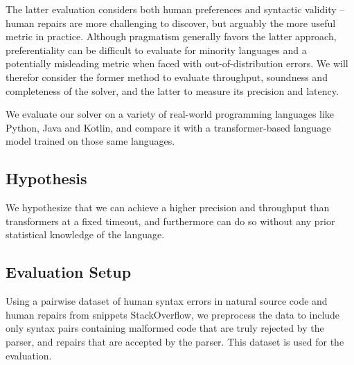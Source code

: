\documentclass[sigplan,screen]{acmart}
\begin{document}
The latter evaluation considers both human preferences and syntactic validity -- human repairs are more challenging to discover, but arguably the more useful metric in practice. Although pragmatism generally favors the latter approach, preferentiality can be difficult to evaluate for minority languages and a potentially misleading metric when faced with out-of-distribution errors. We will therefor consider the former method to evaluate throughput, soundness and completeness of the solver, and the latter to measure its precision and latency.

We evaluate our solver on a variety of real-world programming languages like Python, Java and Kotlin, and compare it with a transformer-based language model trained on those same languages.

\subsection{Hypothesis}


We hypothesize that we can achieve a higher precision and throughput than transformers at a fixed timeout, and furthermore can do so without any prior statistical knowledge of the language.

\subsection{Evaluation Setup}


Using a pairwise dataset of human syntax errors in natural source code and human repairs from snippets StackOverflow, we preprocess the data to include only syntax pairs containing malformed code that are truly rejected by the parser, and repairs that are accepted by the parser. This dataset is used for the evaluation.



\end{document}
